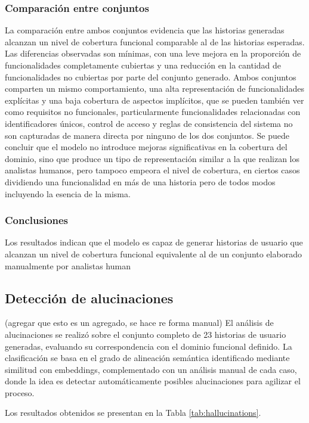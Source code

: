 \subsubsection{Comparación entre conjuntos}
La comparación entre ambos conjuntos evidencia que las historias generadas alcanzan un nivel de cobertura funcional comparable al de las historias esperadas. Las diferencias observadas son mínimas, con una leve mejora en la proporción de funcionalidades completamente cubiertas y una reducción en la cantidad de funcionalidades no cubiertas por parte del conjunto generado.
Ambos conjuntos comparten un mismo comportamiento, una alta representación de funcionalidades explícitas y una baja cobertura de aspectos implícitos, que se pueden también ver como requisitos no funcionales, particularmente funcionalidades relacionadas con identificadores únicos, control de acceso y reglas de consistencia del sistema no son capturadas de manera directa por ninguno de los dos conjuntos. Se puede concluir que el modelo no introduce mejoras significativas en la cobertura del dominio, sino que produce un tipo de representación similar a la que realizan los analistas humanos, pero tampoco empeora el nivel de cobertura, en ciertos casos dividiendo una funcionalidad en más de una historia pero de todos modos incluyendo la esencia de la misma.
\subsubsection{Conclusiones}
Los resultados indican que el modelo es capaz de generar historias de usuario que alcanzan un nivel de cobertura funcional equivalente al de un conjunto elaborado manualmente por analistas human

\subsection{Detección de alucinaciones}
(agregar que esto es un agregado, se hace re forma manual)
El análisis de alucinaciones se realizó sobre el conjunto completo de 23 historias de usuario generadas, evaluando su correspondencia con el dominio funcional definido. La clasificación se basa en el grado de alineación semántica identificado mediante similitud con embeddings, complementado con un análisis manual de cada caso, donde la idea es detectar automáticamente posibles alucinaciones para agilizar el proceso.

Los resultados obtenidos se presentan en la Tabla \ref{tab:hallucinations}.

